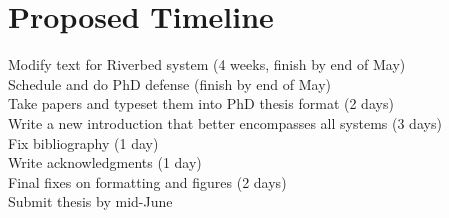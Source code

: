 \section{Proposed Timeline}

Modify text for Riverbed system (4 weeks, finish by end of May)  \\
Schedule and do PhD defense (finish by end of May) \\
Take papers and typeset them into PhD thesis format (2 days) \\
Write a new introduction that better encompasses all systems (3 days) \\
Fix bibliography (1 day) \\
Write acknowledgments (1 day) \\
Final fixes on formatting and figures (2 days) \\
Submit thesis by mid-June 